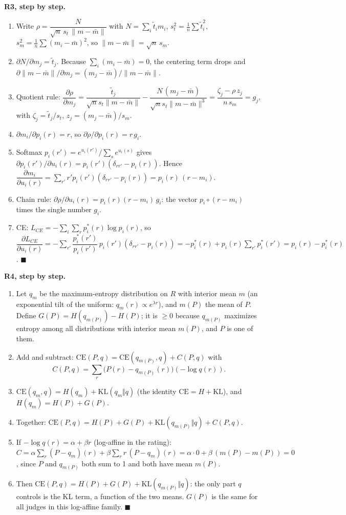 \documentclass[11pt]{article}
\newcommand{\ttil}{\tilde t}
\begin{document}
\textbf{R3, step by step.}
\begin{enumerate}\setlength{\itemsep}{1pt}
\item Write $\rho=\dfrac{N}{\sqrt n\,s_t\,\lVert m-\bar m\rVert}$ with $N=\sum_i\ttil_i m_i$, $s_t^2=\frac1n\sum\ttil_i^2$, $s_m^2=\frac1n\sum(m_i-\bar m)^2$, so $\lVert m-\bar m\rVert=\sqrt n\,s_m$.
\item $\partial N/\partial m_j=\ttil_j$. Because $\sum_i(m_i-\bar m)=0$, the centering term drops and $\partial\lVert m-\bar m\rVert/\partial m_j=(m_j-\bar m)/\lVert m-\bar m\rVert$.
\item Quotient rule: $\dfrac{\partial\rho}{\partial m_j}=\dfrac{\ttil_j}{\sqrt n s_t\lVert m-\bar m\rVert}-\dfrac{N\,(m_j-\bar m)}{\sqrt n s_t\lVert m-\bar m\rVert^3}=\dfrac{\zeta_j-\rho\,z_j}{n\,s_m}=g_j$, with $\zeta_j=\ttil_j/s_t$, $z_j=(m_j-\bar m)/s_m$.
\item $\partial m_i/\partial p_i(r)=r$, so $\partial\rho/\partial p_i(r)=r\,g_i$.
\item Softmax $p_i(r')=e^{u_i(r')}/\sum_s e^{u_i(s)}$ gives $\partial p_i(r')/\partial u_i(r)=p_i(r')(\delta_{rr'}-p_i(r))$. Hence $\dfrac{\partial m_i}{\partial u_i(r)}=\sum_{r'}r'p_i(r')(\delta_{rr'}-p_i(r))=p_i(r)\,(r-m_i)$.
\item Chain rule: $\partial\rho/\partial u_i(r)=p_i(r)(r-m_i)\,g_i$: the vector $p_i\circ(r-m_i)$ times the single number $g_i$.
\item CE: $L_{CE}=-\sum_i\sum_r p^\ast_i(r)\log p_i(r)$, so $\dfrac{\partial L_{CE}}{\partial u_i(r)}=-\sum_{r'}\dfrac{p^\ast_i(r')}{p_i(r')}\,p_i(r')(\delta_{rr'}-p_i(r))=-p^\ast_i(r)+p_i(r)\sum_{r'}p^\ast_i(r')=p_i(r)-p^\ast_i(r)$. \hfill$\blacksquare$
\end{enumerate}

\textbf{R4, step by step.}
\begin{enumerate}\setlength{\itemsep}{1pt}
\item Let $q_m$ be the maximum-entropy distribution on $R$ with interior mean $m$ (an exponential tilt of the uniform: $q_m(r)\propto e^{\lambda r}$), and $m(P)$ the mean of $P$. Define $G(P)=H(q_{m(P)})-H(P)$; it is $\ge0$ because $q_{m(P)}$ maximizes entropy among all distributions with interior mean $m(P)$, and $P$ is one of them.
\item Add and subtract: $\mathrm{CE}(P,q)=\mathrm{CE}(q_{m(P)},q)+C(P,q)$ with \[C(P,q)=\sum_r\big(P(r)-q_{m(P)}(r)\big)(-\log q(r)).\]
\item $\mathrm{CE}(q_m,q)=H(q_m)+\mathrm{KL}(q_m\Vert q)$ (the identity $\mathrm{CE}=H+\mathrm{KL}$), and $H(q_m)=H(P)+G(P)$.
\item Together: $\mathrm{CE}(P,q)=H(P)+G(P)+\mathrm{KL}(q_{m(P)}\Vert q)+C(P,q)$.
\item If $-\log q(r)=\alpha+\beta r$ (log-affine in the rating): $C=\alpha\sum_r(P-q_m)(r)+\beta\sum_r r\,(P-q_m)(r)=\alpha\cdot0+\beta\,(m(P)-m(P))=0$, since $P$ and $q_{m(P)}$ both sum to 1 and both have mean $m(P)$.
\item Then $\mathrm{CE}(P,q)=H(P)+G(P)+\mathrm{KL}(q_{m(P)}\Vert q)$: the only part $q$ controls is the KL term, a function of the two means. $G(P)$ is the same for all judges in this log-affine family. \hfill$\blacksquare$
\end{enumerate}
\end{document}
